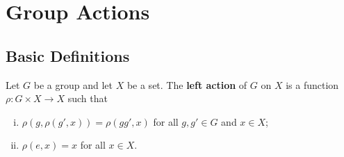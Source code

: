 \section{Group Actions}
\subsection{Basic Definitions}
\begin{definition}
	Let $G$ be a group and let $X$ be a set. The \textbf{left action} of $G$ on $X$ is a function $\rho: G\times X\rightarrow X$ such that
	\begin{enumerate}[(i)]
		\item $\rho(g,\rho(g',x)) = \rho(gg',x)$ for all $g,g'\in G$ and $x\in X$;
		\item $\rho(e,x) =x$ for all $x\in X$.
	\end{enumerate}
\end{definition}
